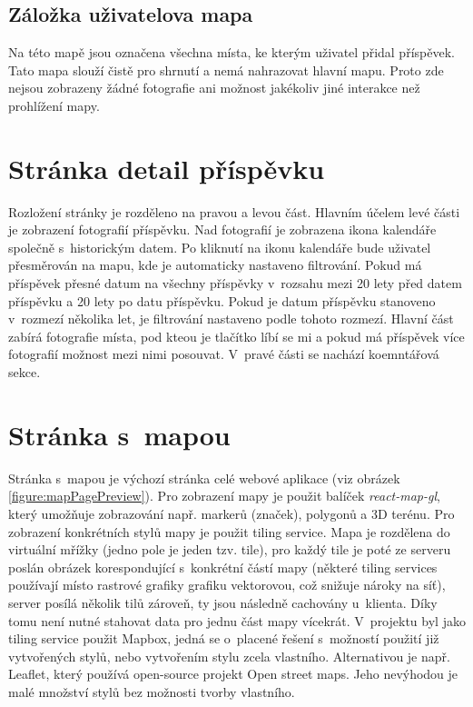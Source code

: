 \documentclass[12pt, a4paper,
  oneside,      %
]{report}
\begin{document}
\subsection{Záložka uživatelova mapa}
Na této mapě jsou označena všechna místa, ke kterým uživatel přidal příspěvek. Tato mapa slouží čistě pro shrnutí a nemá nahrazovat hlavní mapu. Proto zde nejsou zobrazeny žádné fotografie ani možnost jakékoliv jiné interakce než prohlížení mapy.

\section{Stránka detail příspěvku}
Rozložení stránky je rozděleno na pravou a levou část. Hlavním účelem levé části je zobrazení fotografií příspěvku. Nad fotografií je zobrazena ikona kalendáře společně s~historickým datem. Po kliknutí na ikonu kalendáře bude uživatel přesměrován na mapu, kde je automaticky nastaveno filtrování. Pokud má příspěvek přesné datum na všechny příspěvky v~rozsahu mezi 20 lety před datem příspěvku a 20 lety po datu příspěvku. Pokud je datum příspěvku stanoveno v~rozmezí několika let, je filtrování nastaveno podle tohoto rozmezí. Hlavní část zabírá fotografie místa, pod kteou je tlačítko líbí se mi a pokud má příspěvek více fotografií možnost mezi nimi posouvat. V~pravé části se nachází koemntářová sekce.


\section{Stránka s~mapou}
Stránka s~mapou je výchozí stránka celé webové aplikace (viz obrázek \ref{figure:mapPagePreview}). Pro zobrazení mapy je použit balíček \textit{react-map-gl}, který umožňuje zobrazování např. markerů (značek), polygonů a 3D terénu. Pro zobrazení konkrétních stylů mapy je použit tiling service. Mapa je rozdělena do virtuální mřížky (jedno pole je jeden tzv. tile), pro každý tile je poté ze serveru poslán obrázek korespondující s~konkrétní částí mapy (některé tiling services používají místo rastrové grafiky grafiku vektorovou, což snižuje nároky na síť), server posílá několik tilů zároveň, ty jsou následně cachovány u~klienta. Díky tomu není nutné stahovat data pro jednu část mapy vícekrát. V~projektu byl jako tiling service použit Mapbox, jedná se o~placené řešení s~možností použití již vytvořených stylů, nebo vytvořením stylu zcela vlastního. Alternativou je např. Leaflet, který používá open-source projekt Open street maps. Jeho nevýhodou je malé množství stylů bez možnosti tvorby vlastního.
\end{document}
